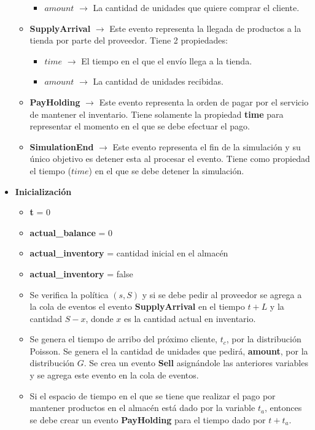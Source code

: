 \documentclass{article}
\begin{document}
\begin{itemize}
\begin{itemize}
\begin{itemize}
            \item $amount$ $\to$ La cantidad de unidades que quiere comprar el cliente.
        \end{itemize}
        \item \textbf{SupplyArrival} $\to$ Este evento representa la llegada de productos a la tienda por parte del proveedor. Tiene 2 propiedades:
        \begin{itemize}
            \item $time$ $\to$ El tiempo en el que el envío llega a la tienda.
            \item $amount$ $\to$ La cantidad de unidades recibidas.
        \end{itemize}
        \item \textbf{PayHolding} $\to$ Este evento representa la orden de pagar por el servicio de mantener el inventario. Tiene solamente la propiedad \textbf{time} para representar el momento en el que se debe efectuar el pago.
        \item \textbf{SimulationEnd} $\to$ Este evento representa el fin de la simulación y su único objetivo es detener esta al procesar el evento. Tiene como propiedad el tiempo ($time$) en el que se debe detener la simulación.
    \end{itemize}
    \item \textbf{Inicialización}
    \begin{itemize}
        \item \textbf{t} = 0
        \item \textbf{actual\_balance} = 0
        \item \textbf{actual\_inventory} = cantidad inicial en el almacén
        \item \textbf{actual\_inventory} = false
        \item Se verifica la política $(s,S)$ y si se debe pedir al proveedor se agrega a la cola de eventos el evento \textbf{SupplyArrival} en el tiempo $t + L$ y la cantidad $S-x$, donde $x$ es la cantidad actual en inventario.
        \item Se genera el tiempo de arribo del próximo cliente, $t_c$, por la distribución Poisson. Se genera el la cantidad de unidades que pedirá, \textbf{amount}, por la distribución $G$. Se crea un evento \textbf{Sell} asignándole las anteriores variables y se agrega este evento en la cola de eventos.
        \item Si el espacio de tiempo en el que se tiene que realizar el pago por mantener productos en el almacén está dado por la variable $t_a$, entonces se debe crear un evento \textbf{PayHolding} para el tiempo dado por $t+t_a$.

\end{itemize}
\end{itemize}
\end{document}
